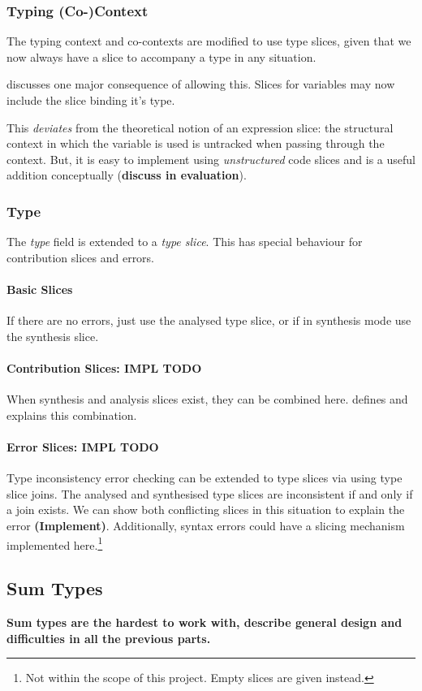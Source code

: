 \subsubsection{Typing (Co-)Context}
The typing context and co-contexts are modified to use type slices, given that we now always have a slice to accompany a type in any situation. 

 discusses one major consequence of allowing this. Slices for variables may now include the slice binding it's type. 

This \textit{deviates} from the theoretical notion of an expression slice: the structural context in which the variable is used is untracked when passing through the context. But, it is easy to implement using \textit{unstructured} code slices and is a useful addition conceptually (\textbf{discuss in evaluation}).

\subsubsection{Type}
The \textit{type} field is extended to a \textit{type slice}. This has special behaviour for contribution slices and errors.
\paragraph{Basic Slices} 
If there are no errors, just use the analysed type slice, or if in synthesis mode use the synthesis slice. 
\paragraph{Contribution Slices: IMPL TODO}
When synthesis and analysis slices exist, they can be combined here.  defines and explains this combination.

\paragraph{Error Slices: IMPL TODO}
Type inconsistency error checking can be extended to type slices via using type slice joins. The analysed and synthesised type slices are inconsistent if and only if a join exists. We can show both conflicting slices in this situation to explain the error \textbf{(Implement)}. Additionally, syntax errors could have a slicing mechanism implemented here.\footnote{Not within the scope of this project. Empty slices are given instead.}

\subsection{Sum Types}
\textbf{Sum types are the hardest to work with, describe general design and difficulties in all the previous parts.}

